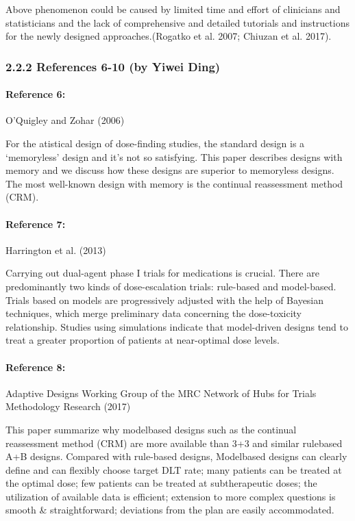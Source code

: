 \documentclass[
]{article}
\begin{document}
Above phenomenon could be caused by limited time and effort of
clinicians and statisticians and the lack of comprehensive and detailed
tutorials and instructions for the newly designed approaches.(Rogatko et
al. 2007; Chiuzan et al. 2017).

\hypertarget{references-6-10-by-yiwei-ding}{%
\subsubsection{2.2.2 References 6-10 (by Yiwei
Ding)}\label{references-6-10-by-yiwei-ding}}

\hypertarget{reference-6}{%
\paragraph{Reference 6:}\label{reference-6}}

O'Quigley and Zohar (2006)

For the atistical design of dose-finding studies, the standard design is
a `memoryless' design and it's not so satisfying. This paper describes
designs with memory and we discuss how these designs are superior to
memoryless designs. The most well-known design with memory is the
continual reassessment method (CRM).

\hypertarget{reference-7}{%
\paragraph{Reference 7:}\label{reference-7}}

Harrington et al. (2013)

Carrying out dual-agent phase I trials for medications is crucial. There
are predominantly two kinds of dose-escalation trials: rule-based and
model-based. Trials based on models are progressively adjusted with the
help of Bayesian techniques, which merge preliminary data concerning the
dose-toxicity relationship. Studies using simulations indicate that
model-driven designs tend to treat a greater proportion of patients at
near-optimal dose levels.

\hypertarget{reference-8}{%
\paragraph{Reference 8:}\label{reference-8}}

Adaptive Designs Working Group of the MRC Network of Hubs for Trials
Methodology Research (2017)

This paper summarize why modelbased designs such as the continual
reassessment method (CRM) are more available than 3+3 and similar
rulebased A+B designs. Compared with rule-based designs, Modelbased
designs can clearly define and can flexibly choose target DLT rate; many
patients can be treated at the optimal dose; few patients can be treated
at subtherapeutic doses; the utilization of available data is efficient;
extension to more complex questions is smooth \& straightforward;
deviations from the plan are easily accommodated.
\end{document}
